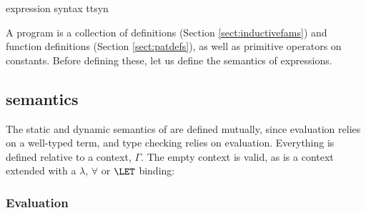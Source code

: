 {\TT{} expression syntax}
{ttsyn}

A \TT{} program is a collection of  definitions (Section 
\ref{sect:inductivefams}) and  function definitions (Section
\ref{sect:patdefs}), as well as primitive operators on constants. 
Before defining these, let us define the semantics of \TT{}
expressions.

\subsection{\TT{} semantics}

The static and dynamic semantics of \TT{} are defined mutually, since
evaluation relies on a well-typed term, and type checking relies on 
evaluation. Everything is defined relative
to a context, $\Gamma$. The empty context
is valid, as is a context extended with a $\lambda$, $\forall$ or
$\LET$ binding:


\subsubsection{Evaluation}

\label{sect:evaluation}

